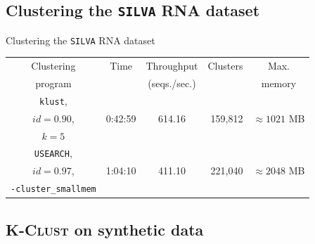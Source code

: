 \documentclass{beamer}
\begin{document}

\subsection{Clustering the \texttt{SILVA} RNA dataset}

\begin{frame}{Clustering the \texttt{SILVA} RNA dataset}
  \begin{adjustbox}{center}
  \footnotesize
  \begin{tabular}{c|c|c|r|c}
  Clustering        & Time    & Throughput   & Clusters & Max.              \\
  program           &         & (seqs./sec.) &          & memory            \\
  \hline \hline
  \texttt{klust},   &         &              &          &                   \\
  $id = 0.90$,      & 0:42:59 & 614.16       & 159,812  & $\approx 1021$ MB \\
  $k = 5$           &         &              &          &                   \\
  \hline
  \texttt{USEARCH}, &         &              &          &                   \\
  $id=0.97$,        & 1:04:10 & 411.10       & 221,040  & $\approx 2048$ MB \\
  \texttt{-cluster\_smallmem} & & & & \\
  \end{tabular}
  \end{adjustbox}
\end{frame}

\subsection{\textsc{K-Clust} on synthetic data}
\end{document}
